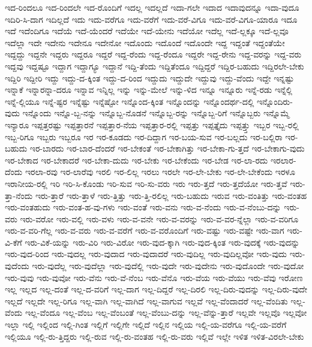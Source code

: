 {ಇದ-ರಿಂದಲೂ
ಇದ-ರಿಂದಲೇ
ಇದ-ರೊಂದಿಗೆ
ಇದಲ್ಲ
ಇದಲ್ಲದೆ
ಇದಾ-ಗಲೇ
ಇದಾದ
ಇದಾವುದನ್ನೂ
ಇದಾ-ವುದೂ
ಇದಿರಿ-ಸಿ-ದಾಗ
ಇದಿಲ್ಲದೆ
ಇದು
ಇದು-ವರೆಗೂ
ಇದು-ವರೆಗೆ
ಇದು-ವರೆ-ವಿಗೂ
ಇದು-ವರೆ-ವಿಗೂ-ಯಾರೂ
ಇದೂ
ಇದೆ
ಇದೆಂದಿಗೂ
ಇದೆಯೆ
ಇದೆ-ಯೆಂದರೆ
ಇದೆಯೇ
ಇದೆ-ಯೇನು
ಇದೆಯೋ
ಇದೆಲ್ಲ
ಇದೆ-ಲ್ಲಕ್ಕೂ
ಇದೆ-ಲ್ಲವೂ
ಇದೆಲ್ಲಾ
ಇದೇ
ಇದೇನು
ಇದೇನೂ
ಇದೇನೋ
ಇದೊಂದು
ಇದೊಂದೆ
ಇದೊಂದೇ
ಇದ್ದ
ಇದ್ದಂತೆ
ಇದ್ದಂತೆಯೇ
ಇದ್ದದ್ದು
ಇದ್ದನೇ
ಇದ್ದರು
ಇದ್ದರೂ
ಇದ್ದರೆ
ಇದ್ದ-ರೆಂದು
ಇದ್ದ-ರೆಂದೂ
ಇದ್ದರೇ
ಇದ್ದ-ರೇನು
ಇದ್ದ-ವರನ್ನು
ಇದ್ದ-ವರು
ಇದ್ದವು
ಇದ್ದಷ್ಟೂ
ಇದ್ದಾಗ
ಇದ್ದಾಗ್ಯೂ
ಇದ್ದಾನೆ
ಇದ್ದಿ-ತೆಂದು
ಇದ್ದಿತೆಂದೂ
ಇದ್ದಿದ್ದರೆ
ಇದ್ದಿರ-ಬಹುದು
ಇದ್ದಿರಲೇ-ಬೇಕು
ಇದ್ದಿರಿ
ಇದ್ದೀರಿ
ಇದ್ದು
ಇದ್ದು-ದ-ಕ್ಕಿಂತ
ಇದ್ದು-ದ-ರಿಂದ
ಇದ್ದುದು
ಇದ್ದುದೇ
ಇದ್ದುವು
ಇದ್ದು-ವೆಂದು
ಇದ್ದೇ
ಇನ್ನಷ್ಟು
ಇನ್ನಾಕೆ
ಇನ್ನಾರನ್ನಾ-ದರೂ
ಇನ್ನಾವ
ಇನ್ನಿಲ್ಲ
ಇನ್ನು
ಇನ್ನು-ಮೇಲೆ
ಇನ್ನು-ಳಿದ
ಇನ್ನೂ
ಇನ್ನೂರು
ಇನ್ನೆ-ರಡು
ಇನ್ನೆಲ್ಲಿ
ಇನ್ನೆ-ಲ್ಲಿಯೂ
ಇನ್ನೆ-ಷ್ಟರ
ಇನ್ನೆಷ್ಟು
ಇನ್ನೆಷ್ಟೋ
ಇನ್ನೊಂದ-ಕ್ಕಿಂತ
ಇನ್ನೊಂದನ್ನು
ಇನ್ನೊಂದರ್ಥ-ದಲ್ಲಿ
ಇನ್ನೊಂದಿರು-ವುದು
ಇನ್ನೊಂದು
ಇನ್ನೊ-ಬ್ಬ-ನನ್ನು
ಇನ್ನೊಬ್ಬ-ನೊಡನೆ
ಇನ್ನೊಬ್ಬ-ರನ್ನು
ಇನ್ನೊಬ್ಬ-ರಿಗೆ
ಇನ್ನೊಬ್ಬರು
ಇನ್ನೊಮ್ಮೆ
ಇನ್ಯಾರೂ
ಇಪ್ಪತ್ತರಷ್ಟು
ಇಪ್ಪತ್ತಾರನೆ
ಇಪ್ಪತ್ತಾರ-ನೆಯ
ಇಪ್ಪತ್ತಾರ-ರಲ್ಲಿ
ಇಪ್ಪತ್ತು
ಇಪ್ಪತ್ತೈದು
ಇಪ್ಪತ್ತ್ತು
ಇಬ್ಬರ
ಇಬ್ಬ-ರಲ್ಲಿ
ಇಬ್ಬ-ರಿಗೂ
ಇಬ್ಬರು
ಇಬ್ಬರೂ
ಇರ
ಇರ-ಕೂಡದು
ಇರ-ದಿದ್ದಾಗ
ಇರ-ಬಯ-ಸುವ
ಇರ-ಬಲ್ಲದು
ಇರ-ಬಲ್ಲಿರಾ
ಇರ-ಬಹುದು
ಇರ-ಬಾರದು
ಇರ-ಬಾರ-ದೆಂದರೆ
ಇರ-ಬೇಕಂತೆ
ಇರ-ಬೇಕಾಗಿತ್ತು
ಇರ-ಬೇಕಾ-ಗು-ತ್ತದೆ
ಇರ-ಬೇಕಾಗು-ವುದು
ಇರ-ಬೇಕಾದ
ಇರ-ಬೇಕಾದರೆ
ಇರ-ಬೇಕಾ-ದುದು
ಇರ-ಬೇಕು
ಇರ-ಬೇಕೆಂದು
ಇರ-ಬೇಡ
ಇರ-ಲಾ-ರದು
ಇರಲಾರ-ದೆಂದು
ಇರಲಾ-ರವು
ಇರ-ಲಾರೆವು
ಇರಲಿ
ಇರ-ಲಿಲ್ಲ
ಇರಲು
ಇರಲೇ
ಇರ-ಲೇ-ಬೇಕು
ಇರ-ಲೇ-ಬೇಕೆಂದು
ಇರಳೂ
ಇರಾನೀಯ-ರಲ್ಲಿ
ಇರಿ
ಇರಿ-ಸಿ-ಕೊಂಡು
ಇರಿ-ಸುವ
ಇರಿ-ಸು-ವರು
ಇರು
ಇರು-ತ್ತದೆ
ಇರು-ತ್ತದೆಯೋ
ಇರು-ತ್ತವೆ
ಇರು-ತ್ತಾ-ನೆಂದು
ಇರು-ತ್ತಾರೆ
ಇರು-ತ್ತಾಳೆ
ಇರು-ತ್ತಿತ್ತು
ಇರು-ತ್ತಿ-ರಲಿಲ್ಲ
ಇರು-ಬಹುದು
ಇರುವ
ಇರು-ವಂತಿತ್ತು
ಇರು-ವಂತಹ
ಇರು-ವಂತಹುದು
ಇರು-ವಂತ-ಹ-ವು-ಗಳು
ಇರು-ವಂತೆ
ಇರು-ವನು
ಇರು-ವ-ನೆಂದು
ಇರು-ವ-ನೆಂಬು-ದನ್ನು
ಇರು-ವರು
ಇರು-ವರೋ
ಇರು-ವಲ್ಲಿ
ಇರು-ವಳು
ಇರು-ವ-ವನೇ
ಇರು-ವ-ವರನ್ನು
ಇರು-ವ-ವರ-ನ್ನೆಲ್ಲಾ
ಇರು-ವ-ವರಿಗೂ
ಇರು-ವ-ವರಿ-ಗೆಲ್ಲ
ಇರು-ವ-ವರು
ಇರು-ವ-ವರೆಗೆ
ಇರು-ವ-ವರೊಂದಿಗೆ
ಇರು-ವಷ್ಟು
ಇರು-ವಷ್ಟೇ
ಇರು-ವಾಗ
ಇರು-ವಿ-ಕೆಗೆ
ಇರು-ವಿಕೆ-ಯನ್ನು
ಇರು-ವಿರಿ
ಇರು-ವಿರೋ
ಇರು-ವುದ-ಕ್ಕಾಗಿ
ಇರು-ವುದ-ಕ್ಕಿಂತ
ಇರು-ವುದಕ್ಕೆ
ಇರು-ವುದನ್ನು
ಇರು-ವುದ-ರಿಂದ
ಇರು-ವುದಲ್ಲ
ಇರು-ವುದಾದ
ಇರು-ವುದಾದರೆ
ಇರು-ವುದಿಲ್ಲ
ಇರು-ವುದಿಲ್ಲವೋ
ಇರು-ವುದು
ಇರು-ವುದೆಂದು
ಇರು-ವುದೆಲ್ಲ
ಇರು-ವುದೆಲ್ಲಾ
ಇರು-ವುದೆಲ್ಲಿ
ಇರು-ವುದೇ
ಇರು-ವುದೇನು
ಇರು-ವುದೊಂದೇ
ಇರು-ವುದೋ
ಇರು-ವುವು
ಇರು-ವುವೋ
ಇರು-ವೆನು
ಇರು-ವೆ-ನೆಂಬ
ಇರು-ವೆನೊ
ಇರು-ವೆಯ
ಇರು-ವೆಯು
ಇರು-ವೆವು
ಇರೋಣ
ಇಲ್ಲ
ಇಲ್ಲದ
ಇಲ್ಲ-ದಂತೆ
ಇಲ್ಲ-ದ-ವರಿಗೆ
ಇಲ್ಲ-ದಾಗ
ಇಲ್ಲ-ದಿದ್ದರೆ
ಇಲ್ಲ-ದಿರಲಿ
ಇಲ್ಲ-ದಿರು-ವುದನ್ನು
ಇಲ್ಲ-ದಿರು-ವುದೇ
ಇಲ್ಲದೆ
ಇಲ್ಲದೇ
ಇಲ್ಲ-ರಿಗೂ
ಇಲ್ಲ-ವಾಗಿ
ಇಲ್ಲ-ವಾಗಿದೆ
ಇಲ್ಲ-ವಾಗುವ
ಇಲ್ಲವೆ
ಇಲ್ಲ-ವೆಂದಾದರೆ
ಇಲ್ಲ-ವೆಂದಿತು
ಇಲ್ಲ-ವೆಂದು
ಇಲ್ಲ-ವೆಂದೂ
ಇಲ್ಲ-ವೆಂಬ
ಇಲ್ಲ-ವೆಂಬಂತೆ
ಇಲ್ಲ-ವೆಂಬು-ದನ್ನು
ಇಲ್ಲ-ವೆನ್ನು-ತ್ತಾರೆ
ಇಲ್ಲವೇ
ಇಲ್ಲವೊ
ಇಲ್ಲವೋ
ಇಲ್ಲಾ
ಇಲ್ಲಿ
ಇಲ್ಲಿಂದ
ಇಲ್ಲಿ-ಗಿಂತ
ಇಲ್ಲಿಗೆ
ಇಲ್ಲಿಗೇ
ಇಲ್ಲಿದೆ
ಇಲ್ಲಿನ
ಇಲ್ಲಿಯ
ಇಲ್ಲಿ-ಯ-ವರೆಗೂ
ಇಲ್ಲಿ-ಯ-ವರೆಗೆ
ಇಲ್ಲಿಯೂ
ಇಲ್ಲಿ-ರು-ತ್ತಿದ್ದರು
ಇಲ್ಲಿ-ರುವ
ಇಲ್ಲಿ-ರು-ವಂತಹ
ಇಲ್ಲಿ-ರು-ವರು
ಇಲ್ಲಿವೆ
ಇಲ್ಲೇ
ಇಳಿತ
ಇಳಿತ-ವಿರಲೇ-ಬೇಕು
}
